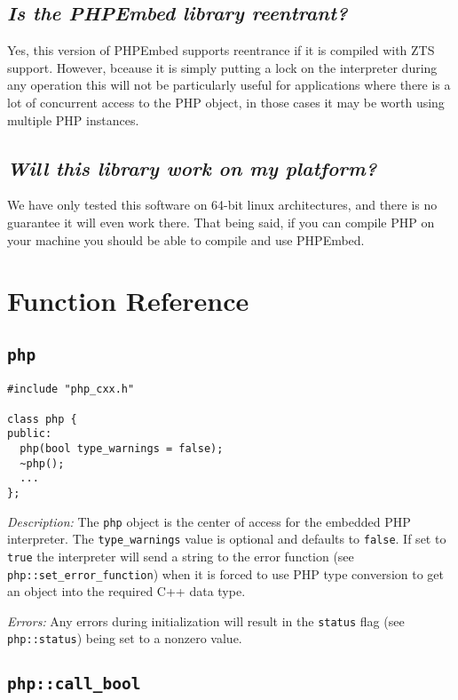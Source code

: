 \documentclass[11pt,titlepage]{article}
\begin{document}
\subsection{\emph{Is the PHPEmbed library reentrant?}}
Yes, this version of PHPEmbed supports reentrance if it is compiled with ZTS support. However, bceause it is simply putting a lock on the interpreter during any operation this will not be particularly useful for applications where there is a lot of concurrent access to the PHP object, in those cases it may be worth using multiple PHP instances.

\subsection{\emph{Will this library work on my platform?}}
We have only tested this software on 64-bit linux architectures, and there is no guarantee it will even work there. That being said, if you can compile PHP on your machine you should be able to compile and use PHPEmbed.



\section{Function Reference}


\subsection{\texttt{php}}

\begin{verbatim}
#include "php_cxx.h"

class php {
public:
  php(bool type_warnings = false);
  ~php();
  ...
};
\end{verbatim}

\emph{Description:} The \verb|php| object is the center of access for the embedded PHP interpreter. The \verb|type_warnings| value is optional and defaults to \verb|false|. If set to \verb|true| the interpreter will send a string to the error function (see \verb|php::set_error_function|) when it is forced to use PHP type conversion to get an object into the required C++ data type.

\emph{Errors:} Any errors during initialization will result in the \verb|status| flag (see \verb|php::status|) being set to a nonzero value.


\subsection{\texttt{php::call\_bool}}
\end{document}
